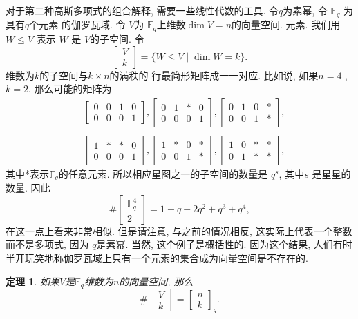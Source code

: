 \documentclass[a4paper,12pt]{ctexbook}
\newtheorem{theorem}[lemma]{\hspace{2em}定理}%
\begin{document}
 对于第二种高斯多项式的组合解释, 需要一些线性代数的工具. 令$q$为素幂, 令 $\mathbb{F}_{q}$ 为具有$q$个元素 的伽罗瓦域. 令 $V$为 $\mathbb{F}_{q} $上维数$\operatorname{dim} V=n$的向量空间.
 元素. 我们用 $W \leq V$ 表示 $W$ 是 $V$的子空间. 令
$$
\left[\begin{array}{l}
V \\
k
\end{array}\right]=\{W \leq V \mid \operatorname{dim} W=k\}.
$$
维数为$k$的子空间与$k \times n$的满秩的 行最简形矩阵成一一对应. 比如说, 如果$n=4$ , $k=2$, 那么可能的矩阵为
$$
\begin{aligned}
&{\left[\begin{array}{llll}
	0 & 0 & 1 & 0 \\
	0 & 0 & 0 & 1
	\end{array}\right],\left[\begin{array}{llll}
	0 & 1 & * & 0 \\
	0 & 0 & 0 & 1
	\end{array}\right],\left[\begin{array}{llll}
	0 & 1 & 0 & * \\
	0 & 0 & 1 & *
	\end{array}\right]}, \\
~\\
&{\left[\begin{array}{llll}
	1 & * & * & 0 \\
	0 & 0 & 0 & 1
	\end{array}\right],\left[\begin{array}{llll}
	1 & * & 0 & * \\
	0 & 0 & 1 & *
	\end{array}\right],\left[\begin{array}{llll}
	1 & 0 & * & * \\
	0 & 1 & * & *
	\end{array}\right],}
\end{aligned}
$$
其中*表示$\mathbb{F}_{q}$的任意元素. 所以相应星图之一的子空间的数量是 $q^{s}$, 其中$s$ 是星星的数量. 因此
$$
\#\left[\begin{array}{c}
\mathbb{F}_{q}^{4} \\
2
\end{array}\right]=1+q+2 q^{2}+q^{3}+q^{4},
$$
在这一点上看来非常相似. 但是请注意, 与之前的情况相反, 这实际上代表一个整数而不是多项式, 因为 $q$是素幂. 当然, 这个例子是概括性的. 因为这个结果, 人们有时半开玩笑地称伽罗瓦域上只有一个元素的集合成为向量空间是不存在的.
\begin{theorem}
	如果$V$是$\mathbb{F}_{q}$维数为$n$的向量空间, 那么
	$$
	\#\left[\begin{array}{l}
	V \\
	k
	\end{array}\right]=\left[\begin{array}{l}
	n \\
	k
	\end{array}\right]_{q}.
	$$
\end{theorem}
\end{document}
